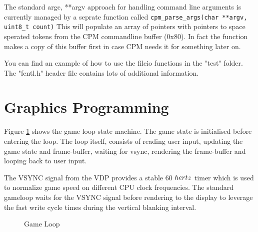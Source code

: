 \documentclass[10pt,a4paper,hidelinks]{article}
\begin{document}
The standard argc, **argv approach for handling command line arguments is
currently managed by a seprate function called \texttt{cpm\_parse\_args(char
**argv, uint8\_t count)}  This will populate an array of pointers with pointers
to space sperated tokens from the CPM commandline buffer (0x80).  In fact the
function makes a copy of this buffer first in case CPM needs it for something
later on.

You can find an example of how to use the fileio functions in the "test"
folder.  The "fcntl.h" header file contains lots of additional information.

\break
\section{Graphics Programming} \label{graphicsprogramming}

Figure \ref{fig:gameloop} shows the game loop state machine.  The game state is
initialised before entering the loop.  The loop itself, consists of reading user
input, updating the game state and frame-buffer, waiting for vsync, rendering
the frame-buffer and looping back to user input.

The VSYNC signal from the VDP provides a stable 60 ${\\hertz}$ timer which is
used to normalize game speed on different CPU clock frequencies.  The standard
gameloop waits for the VSYNC signal before rendering to the display to leverage
the fast write cycle times during the vertical blanking interval.

\begin{figure}[H]
  \begin{center}
  \end{center}
  \caption{Game Loop}
\label{fig:gameloop}
\end{figure}
\end{document}
